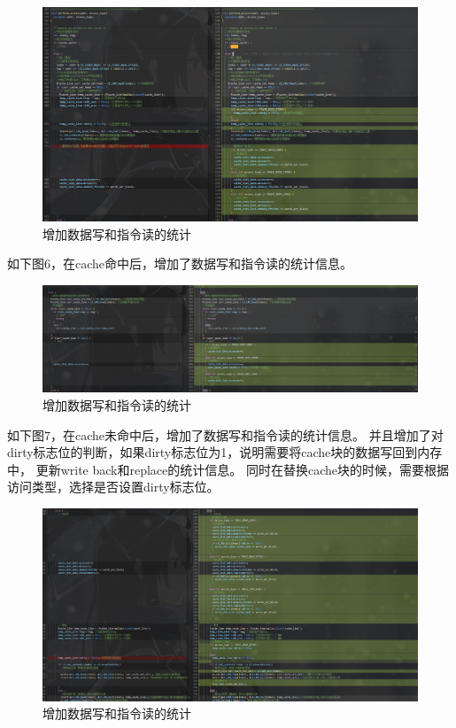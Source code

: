 \documentclass[12pt,hyperref,a4paper,UTF8]{ctexart}
\begin{document}
\begin{figure}[H]
    \centering
    \includegraphics[width=1\textwidth]{./figures/fig/image5.png}
    \caption{增加数据写和指令读的统计}
\end{figure}

如下图6，在cache命中后，增加了数据写和指令读的统计信息。

\begin{figure}[H]
    \centering
    \includegraphics[width=1\textwidth]{./figures/fig/image6.png}
    \caption{增加数据写和指令读的统计}
\end{figure}

如下图7，在cache未命中后，增加了数据写和指令读的统计信息。
并且增加了对dirty标志位的判断，如果dirty标志位为1，说明需要将cache块的数据写回到内存中，
更新write back和replace的统计信息。
同时在替换cache块的时候，需要根据访问类型，选择是否设置dirty标志位。
\begin{figure}[H]
    \centering
    \includegraphics[width=1\textwidth]{./figures/fig/image7.png}
    \caption{增加数据写和指令读的统计}
\end{figure}
\end{document}
